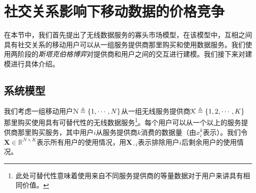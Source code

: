 \section{社交关系影响下移动数据的价格竞争}\label{sec:tvtmodel}

在本节中，我们首先提出了无线数据服务的寡头市场模型，在该模型中，互相之间具有社交关系的移动用户可以从一组服务提供商那里购买和使用数据服务。我们使用两阶段的\emph{斯塔克伯格博弈}对提供商和用户之间的交互进行建模。我们接下来对建模进行具体介绍。


\subsection{系统模型}

我们考虑一组移动用户$\mathcal{N}\triangleq\{1,\cdots,N\}$从一组无线服务提供商$\mathcal{K}\triangleq\{1,2,\cdots,K \} $那里购买使用具有可替代性的无线数据服务\footnote{此处可替代性意味着使用来自不同服务提供商的等量数据对于用户来讲具有相同价值。}。每个用户可以从一个以上的服务提供商那里购买服务，其中用户$i$从服务提供商$k$消费的数据量（由$x^k_i$表示）。我们令$\mathbf{X}\in\mathbb{R}^{N\times K}$表示所有用户的使用情况，用$\mathbf{X}_{-i}$表示排除用户$i$后剩余用户的使用情况。

